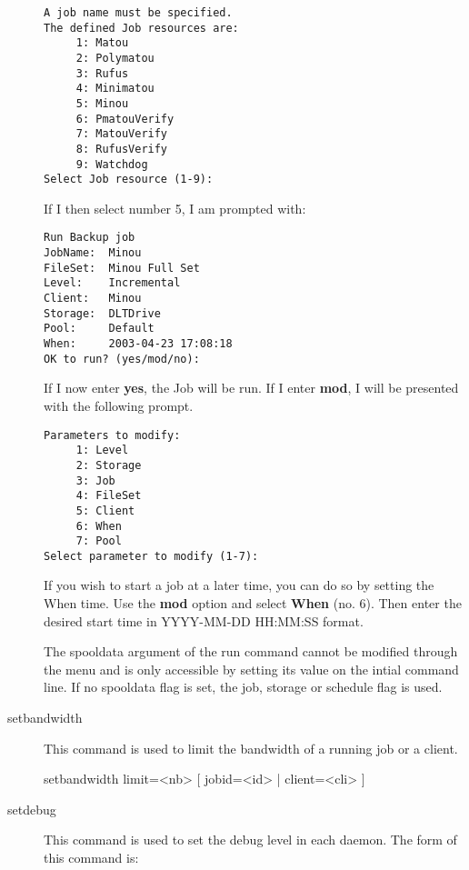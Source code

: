 \begin{description}
\footnotesize
\begin{verbatim}
A job name must be specified.
The defined Job resources are:
     1: Matou
     2: Polymatou
     3: Rufus
     4: Minimatou
     5: Minou
     6: PmatouVerify
     7: MatouVerify
     8: RufusVerify
     9: Watchdog
Select Job resource (1-9):

\end{verbatim}
\normalsize

If I then select number 5, I am prompted with:

\footnotesize
\begin{verbatim}
Run Backup job
JobName:  Minou
FileSet:  Minou Full Set
Level:    Incremental
Client:   Minou
Storage:  DLTDrive
Pool:     Default
When:     2003-04-23 17:08:18
OK to run? (yes/mod/no):

\end{verbatim}
\normalsize

If I now enter {\bf yes}, the Job will be run. If I enter {\bf mod},  I will
be presented with the following prompt.

\footnotesize
\begin{verbatim}
Parameters to modify:
     1: Level
     2: Storage
     3: Job
     4: FileSet
     5: Client
     6: When
     7: Pool
Select parameter to modify (1-7):

\end{verbatim}
\normalsize

If you wish to start a job at a later time, you can do so by setting  the When
time. Use the {\bf mod} option and select {\bf When} (no. 6).  Then enter the
desired start time in YYYY-MM-DD HH:MM:SS format.

The spooldata argument of the run command cannot be modified through the menu
and is only accessible by setting its value on the intial command line. If
no spooldata flag is set, the job, storage or schedule flag is used.

\item[setbandwidth]
  This command is used to limit the bandwidth of a running job or a client.

setbandwidth limit=<nb> [ jobid=<id> | client=<cli> ]

\item [setdebug]
   This command is used to set the debug level in each  daemon. The form of this
   command is:


\end{description}
